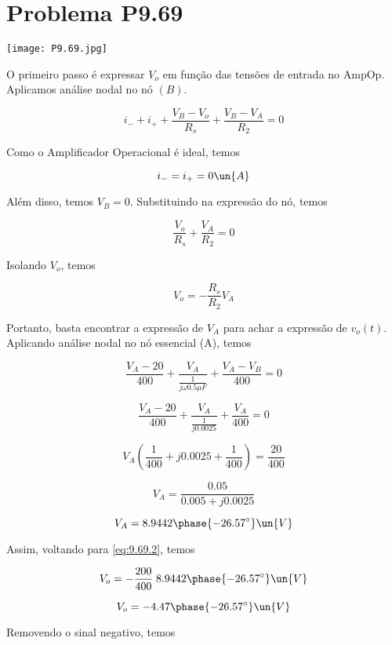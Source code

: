 \section*{Problema P9.69}

\renewcommand*\thesection{9.69}

\begin{center}
    \texttt{[image: P9.69.jpg]}
\end{center}

O primeiro passo é expressar $V_o$ em função das tensões de entrada no AmpOp.
Aplicamos análise nodal no nó $(B)$.

\[ i_- + i_+ + \frac{V_B - V_o}{R_s} + \frac{V_B - V_A}{R_2} = 0 \]

Como o Amplificador Operacional é ideal, temos

\begin{equation}\label{eq:9.69.1}
    i_- = i_+ = 0 \un{A}
\end{equation}

Além disso, temos $V_B = 0$. Substituindo na expressão do nó, temos

\[ \frac{V_o}{R_s} + \frac{V_A}{R_2} = 0 \]

Isolando $V_o$, temos

\begin{equation}\label{eq:9.69.2}
    V_o = -\frac{R_s}{R_2} V_A
\end{equation}

Portanto, basta encontrar a expressão de $V_A$ para achar a expressão de $v_o(t)$. \\
Aplicando análise nodal no nó essencial (A), temos

\[ \frac{V_A - 20}{400} + \frac{V_A}{\frac{1}{j\omega 0.5\mu F}} + \frac{V_A - V_B}{400} = 0 \]

\[ \frac{V_A - 20}{400} + \frac{V_A}{\frac{1}{j0.0025}} + \frac{V_A}{400} = 0 \]

\[ V_A\left(\frac{1}{400} + j0.0025 + \frac{1}{400}\right) = \frac{20}{400}\]

\[ V_A = \frac{0.05}{0.005 + j0.0025} \]

\[ V_A = 8.9442\phase{-26.57^{\circ}} \un{V} \]

Assim, voltando para \eqref{eq:9.69.2}, temos

\[ V_o = -\frac{200}{400} \; 8.9442\phase{-26.57^{\circ}} \un{V} \]

\[ V_o = -4.47\phase{-26.57^{\circ}} \un{V} \]

Removendo o sinal negativo, temos

